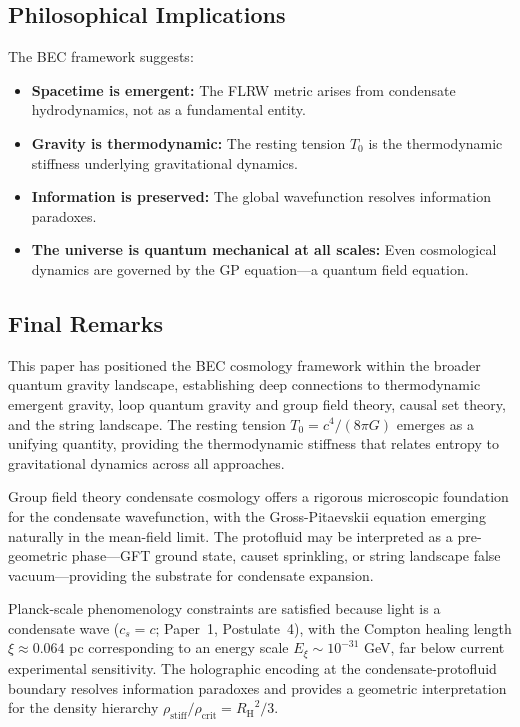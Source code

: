 \documentclass[11pt,a4paper]{article}
\newcommand{\rhocrit}{\ensuremath{\rho_{\mathrm{crit}}}}
\newcommand{\rhostiff}{\ensuremath{\rho_{\mathrm{stiff}}}}
\newcommand{\Tzero}{\ensuremath{T_0}}
\newcommand{\cs}{\ensuremath{c_s}}
\newcommand{\RH}{\ensuremath{R_{\mathrm{H}}}}
\theoremstyle{definition}
\theoremstyle{remark}
\begin{document}
\subsection{Philosophical Implications}
\label{sec:philosophical}

The BEC framework suggests:
\begin{itemize}
\item \textbf{Spacetime is emergent:} The FLRW metric arises from condensate hydrodynamics, not as a fundamental entity.
\item \textbf{Gravity is thermodynamic:} The resting tension $\Tzero$ is the thermodynamic stiffness underlying gravitational dynamics.
\item \textbf{Information is preserved:} The global wavefunction resolves information paradoxes.
\item \textbf{The universe is quantum mechanical at all scales:} Even cosmological dynamics are governed by the GP equation---a quantum field equation.
\end{itemize}

\subsection{Final Remarks}
\label{sec:final_remarks}

This paper has positioned the BEC cosmology framework within the broader quantum gravity landscape, establishing deep connections to thermodynamic emergent gravity, loop quantum gravity and group field theory, causal set theory, and the string landscape. The resting tension $\Tzero = c^4/(8\pi G)$ emerges as a unifying quantity, providing the thermodynamic stiffness that relates entropy to gravitational dynamics across all approaches.

Group field theory condensate cosmology offers a rigorous microscopic foundation for the condensate wavefunction, with the Gross-Pitaevskii equation emerging naturally in the mean-field limit. The protofluid may be interpreted as a pre-geometric phase---GFT ground state, causet sprinkling, or string landscape false vacuum---providing the substrate for condensate expansion.

Planck-scale phenomenology constraints are satisfied because light is a condensate wave ($\cs = c$; Paper~1, Postulate~4), with the Compton healing length $\xi \approx 0.064$ pc corresponding to an energy scale $E_\xi \sim 10^{-31}$ GeV, far below current experimental sensitivity. The holographic encoding at the condensate-protofluid boundary resolves information paradoxes and provides a geometric interpretation for the density hierarchy $\rhostiff/\rhocrit = \RH^2/3$.
\end{document}
